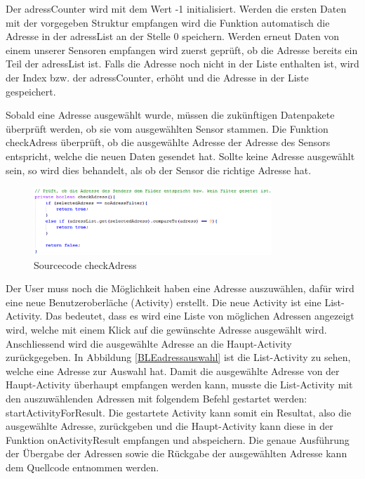 Der adressCounter wird mit dem Wert -1 initialisiert. Werden die ersten Daten mit der vorgegeben Struktur empfangen wird die Funktion automatisch die Adresse in der adressList an der Stelle 0 speichern. Werden erneut Daten von einem unserer Sensoren empfangen wird zuerst geprüft, ob die Adresse bereits ein Teil der adressList ist. Falls die Adresse noch nicht in der Liste enthalten ist, wird der Index bzw. der adressCounter, erhöht und die Adresse in der Liste gespeichert.

Sobald eine Adresse ausgewählt wurde, müssen die zukünftigen Datenpakete überprüft werden, ob sie vom ausgewählten Sensor stammen. Die Funktion checkAdress überprüft, ob die ausgewählte Adresse der Adresse des Sensors entspricht, welche die neuen Daten gesendet hat. Sollte keine Adresse ausgewählt sein, so wird dies behandelt, als ob der Sensor die richtige Adresse hat.

\begin{figure}[ht]
    \includegraphics[width=0.8\textwidth]{3Vorgehen/imag/app_checkAdress.png}
    \caption{Sourcecode checkAdress}
	\label{app_checkAdress} 
\end{figure}

Der User muss noch die Möglichkeit haben eine Adresse auszuwählen, dafür wird eine neue Benutzeroberläche (Activity) erstellt. Die neue Activity ist eine List-Activity. Das bedeutet, dass es wird eine Liste von möglichen Adressen angezeigt wird, welche mit einem Klick auf die gewünschte Adresse ausgewählt wird. Anschliessend wird die ausgewählte Adresse an die Haupt-Activity zurückgegeben. In Abbildung \ref{BLEadressauswahl} ist die List-Activity zu sehen, welche eine Adresse zur Auswahl hat. Damit die ausgewählte Adresse von der Haupt-Activity überhaupt empfangen werden kann, musste die List-Activity mit den auszuwählenden Adressen mit folgendem Befehl gestartet werden: startActivityForResult. Die gestartete Activity kann somit ein Resultat, also die ausgewählte Adresse, zurückgeben und die Haupt-Activity kann diese in der Funktion onActivityResult empfangen und abspeichern. Die genaue Ausführung der Übergabe der Adressen sowie die Rückgabe der ausgewählten Adresse kann dem Quellcode entnommen werden.

